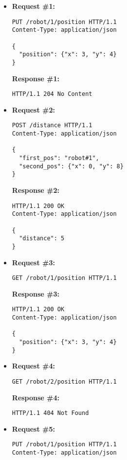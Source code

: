 \begin{itemize}
\item  %
\textbf{Request \#1:}
\begin{lstlisting}[xleftmargin=1pc,numbers=none]
PUT /robot/1/position HTTP/1.1
Content-Type: application/json

{
  "position": {"x": 3, "y": 4}
}
\end{lstlisting}
\textbf{Response \#1:}
\begin{lstlisting}[xleftmargin=1pc,numbers=none]
HTTP/1.1 204 No Content
\end{lstlisting}

\item  %
\textbf{Request \#2:}
\begin{lstlisting}[xleftmargin=1pc,numbers=none]
POST /distance HTTP/1.1
Content-Type: application/json

{
  "first_pos": "robot#1",
  "second_pos": {"x": 0, "y": 8}
}
\end{lstlisting}
\textbf{Response \#2:}
\begin{lstlisting}[xleftmargin=1pc,numbers=none]
HTTP/1.1 200 OK
Content-Type: application/json

{
  "distance": 5
}
\end{lstlisting}

\item  %
\textbf{Request \#3:}
\begin{lstlisting}[xleftmargin=1pc,numbers=none]
GET /robot/1/position HTTP/1.1
\end{lstlisting}
\textbf{Response \#3:}
\begin{lstlisting}[xleftmargin=1pc,numbers=none]
HTTP/1.1 200 OK
Content-Type: application/json

{
  "position": {"x": 3, "y": 4}
}
\end{lstlisting}

\newpage
\item  %
\textbf{Request \#4:}
\begin{lstlisting}[xleftmargin=1pc,numbers=none]
GET /robot/2/position HTTP/1.1
\end{lstlisting}
\textbf{Response \#4:}
\begin{lstlisting}[xleftmargin=1pc,numbers=none]
HTTP/1.1 404 Not Found
\end{lstlisting}

\item  %
\textbf{Request \#5:}
\begin{lstlisting}[xleftmargin=1pc,numbers=none]
PUT /robot/1/position HTTP/1.1
Content-Type: application/json


\end{lstlisting}
\end{itemize}
